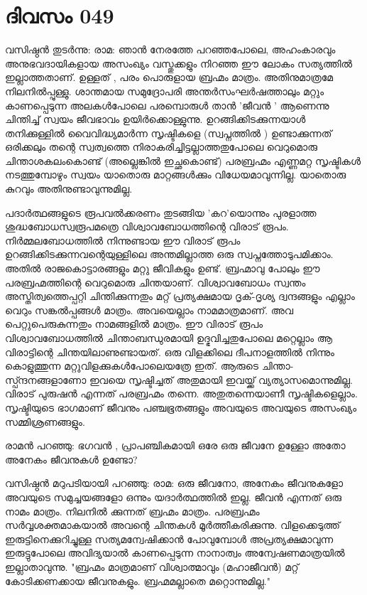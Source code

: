  
\section{ദിവസം 049}


വസിഷ്ഠന്‍ തുടര്‍ന്നു: രാമ: ഞാന്‍ നേരത്തേ പറഞ്ഞപോലെ,  അഹംകാരവും അനുഭവദായികളായ അസംഖ്യം വസ്തുക്കളും നിറഞ്ഞ ഈ ലോകം സത്യത്തിൽ ഇല്ലാത്തതാണ്‌.  ഉള്ളത്‌ , പരം പൊരുളായ ബ്രഹ്മം മാത്രം. അതിനുമാത്രമേ നിലനില്‍പ്പുള്ളു. ശാന്തമായ സമുദ്രോപരി അന്തര്‍സംഘര്‍ഷത്താലും മറ്റും കാണപ്പെടുന്ന അലകള്‍പോലെ പരമ്പൊരുള്‍ താന്‍ 'ജീവന്‍ ' ആണെന്നു ചിന്തിച്ച്‌ സ്വയം ജീവഭാവം ഉയിര്‍ക്കൊള്ളുന്നു. ഉറങ്ങിക്കിടക്കുന്നയാള്‍ തനിക്കുള്ളില്‍ വൈവിദ്ധ്യമാര്‍ന്ന സൃഷ്ടികളെ (സ്വപ്നത്തില്‍ ) ഉണ്ടാക്കുന്നത്‌ ഒരിക്കലും തന്റെ സ്വത്വത്തെ നിരാകരിച്ചിട്ടല്ലാത്തതുപോലെ വെറുമൊരു ചിന്താശകലംകൊണ്ട്‌ (അല്ലെങ്കില്‍ ഇച്ഛകൊണ്ട്‌) പരബ്രഹ്മം എണ്ണമറ്റ സൃഷ്ടികള്‍ നടത്തുമ്പോഴും സ്വയം യാതൊരു മാറ്റങ്ങള്‍ക്കും വിധേയമാവുന്നില്ല. യാതൊരു കുറവും അതിനുണ്ടാവുന്നുമില്ല.

പദാര്‍ത്ഥങ്ങളുടെ രൂപവല്‍ക്കരണം തുടങ്ങിയ 'കറ'യൊന്നും പുരളാത്ത ശുദ്ധബോധസ്വരൂപമത്രെ വിശ്വാവബോധത്തിന്റെ വിരാട്‌ രൂപം. നിര്‍മ്മലബോധത്തില്‍ നിന്നുണ്ടായ ഈ വിരാട്‌ രൂപം ഉറങ്ങിക്കിടക്കുന്നവന്റെയുള്ളിലെ അന്തമില്ലാത്ത ഒരു സ്വപ്നത്തോടുപമിക്കാം. അതില്‍ രാജകൊട്ടാരങ്ങളും മറ്റു ജീവികളും ഉണ്ട്‌. ബ്രഹ്മാവു പോലും ഈ പരബ്രഹ്മത്തിന്റെ വെറുമൊരു ചിന്തയാണ്‌. വിശ്വാവബോധം സ്വന്തം അസ്തിത്വത്തെപ്പറ്റി ചിന്തിക്കുന്നതും മറ്റ്‌ പ്രത്യക്ഷമായ ദൃക്‌-ദൃശ്യ ദ്വന്ദങ്ങളും എല്ലാം വെറും സങ്കല്‍പ്പങ്ങള്‍ മാത്രം. അവയെല്ലാം നാമമാത്രമാണ്‌. അവ പെറ്റുപെരുകുന്നതും നാമങ്ങളില്‍ മാത്രം. ഈ വിരാട്‌ രൂപം വിശ്വാവബോധത്തില്‍ ചിന്താബന്ധുരമായി ഉദ്ഭവിച്ചതുപോലെ  മറ്റെല്ലാം ആ വിരാട്ടിന്റെ ചിന്തയിലാണുണ്ടായത്‌. ഒരു വിളക്കിലെ ദീപനാളത്തില്‍ നിന്നും കൊളുത്തുന്ന മറ്റുവിളക്കുകള്‍പോലെയത്രേ ഇത്‌. ആരുടെ ചിന്താ-സ്പ്ന്ദനങ്ങളാണോ ഇവയെ സൃഷ്ടിച്ചത്‌ അതുമായി ഇവയ്ക്ക്‌ വ്യത്യാസമൊന്നുമില്ല. വിരാട്‌ പുരുഷന്‍ എന്നത്‌ പരബ്രഹ്മം തന്നെ. അതുതന്നെയാണീ സൃഷ്ടികളെല്ലാം. സൃഷ്ടിയുടെ ഭാഗമാണ്‌ ജീവനും പഞ്ചഭൂതങ്ങളും അവയുടെ അവയുടെ അസംഖ്യം സമ്മിശ്രണങ്ങളും.

രാമന്‍ പറഞ്ഞു: ഭഗവന്‍ , പ്രാപഞ്ചികമായി ഒരേ ഒരു ജീവനേ ഉള്ളോ അതോ അനേകം ജീവനുകള്‍ ഉണ്ടോ?

വസിഷ്ഠന്‍ മറുപടിയായി പറഞ്ഞു: രാമ: ഒരു ജീവനോ, അനേകം ജീവനുകളോ അവയുടെ സമുച്ചയങ്ങളോ ഒന്നും യദാര്‍ത്ഥത്തില്‍ ഇല്ല. ജീവന്‍ എന്നത്‌ ഒരു നാമം മാത്രം. നിലനില്‍ ക്കുന്നത്‌ ബ്രഹ്മം മാത്രം. പരബ്രഹ്മം സര്‍വ്വശക്തമാകയാല്‍ അവന്റെ ചിന്തകള്‍ മൂര്‍ത്തീകരിക്കുന്നു. വിളക്കെടുത്ത്‌ ഇരുട്ടിനെക്കുറിച്ചുള്ള സത്യമന്വേഷിക്കാന്‍ പോവുമ്പോള്‍ അപ്രത്യക്ഷമാവുന്ന ഇരുട്ടുപോലെ അവിദ്യയാല്‍ കാണപ്പെടുന്ന നാനാത്വം അന്വേഷണമാത്രയില്‍ ഇല്ലാതാവുന്നു. "ബ്രഹ്മം മാത്രമാണ്‌ വിശ്വാത്മാവും (മഹാജീവന്‍) മറ്റ്‌ കോടിക്കണക്കായ ജീവനുകളും. ബ്രഹ്മമല്ലാതെ മറ്റൊന്നുമില്ല."

